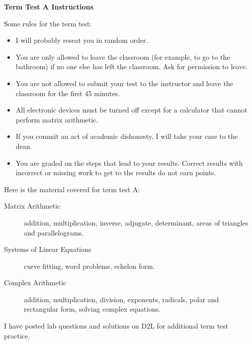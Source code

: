 \documentclass[11pt]{article}
\begin{document}
\textbf{Term Test A Instructions}

Some rules for the term test:
\begin{itemize}
\item I will probably reseat you in random order.
\item You are only allowed to leave the classroom (for example, to go
  to the bathroom) if no one else has left the classroom. Ask for
  permission to leave. 
\item You are not allowed to submit your test to the instructor and
  leave the classroom for the first 45 minutes.
\item All electronic devices must be turned off except for a
  calculator that cannot perform matrix arithmetic.
\item If you commit an act of academic dishonesty, I will take your
  case to the dean.
\item You are graded on the steps that lead to your results. Correct
  results with incorrect or missing work to get to the results do not
  earn points.
\end{itemize}

Here is the material covered for term test A:
\begin{description}
\item[Matrix Arithmetic] addition, multiplication, inverse,
  adjugate, determinant, areas of triangles and parallelograms.
\item[Systems of Linear Equations] curve fitting, word problems,
  echelon form.
\item[Complex Arithmetic] addition, multiplication, division,
  exponents, radicals, polar and rectangular form, solving complex
  equations.
\end{description}

I have posted lab questions and solutions on D2L for additional term
test practice.
\end{document}
